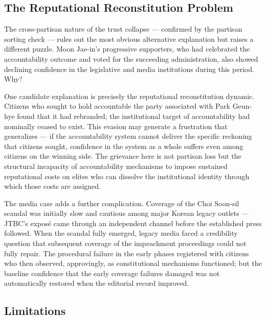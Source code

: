 \documentclass[
  12pt,
  letterpaper]{article}
\begin{document}
\subsection{The Reputational Reconstitution
Problem}\label{the-reputational-reconstitution-problem}

The cross-partisan nature of the trust collapse --- confirmed by the
partisan sorting check --- rules out the most obvious alternative
explanation but raises a different puzzle. Moon Jae-in's progressive
supporters, who had celebrated the accountability outcome and voted for
the succeeding administration, also showed declining confidence in the
legislative and media institutions during this period. Why?

One candidate explanation is precisely the reputational reconstitution
dynamic. Citizens who sought to hold accountable the party associated
with Park Geun-hye found that it had rebranded; the institutional target
of accountability had nominally ceased to exist. This evasion may
generate a frustration that generalizes --- if the accountability system
cannot deliver the specific reckoning that citizens sought, confidence
in the system as a whole suffers even among citizens on the winning
side. The grievance here is not partisan loss but the structural
incapacity of accountability mechanisms to impose sustained reputational
costs on elites who can dissolve the institutional identity through
which those costs are assigned.

The media case adds a further complication. Coverage of the Choi
Soon-sil scandal was initially slow and cautious among major Korean
legacy outlets --- JTBC's exposé came through an independent channel
before the established press followed. When the scandal fully emerged,
legacy media faced a credibility question that subsequent coverage of
the impeachment proceedings could not fully repair. The procedural
failure in the early phases registered with citizens who then observed,
approvingly, as constitutional mechanisms functioned; but the baseline
confidence that the early coverage failures damaged was not
automatically restored when the editorial record improved.

\subsection{Limitations}\label{limitations}
\end{document}
